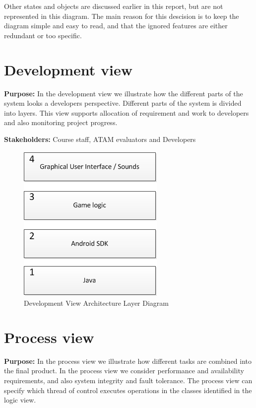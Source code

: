     Other states and objects are discussed earlier in this report, but are not represented in this diagram. The main reason for this descision is to keep the diagram simple and easy to read, and that the ignored features are either redundant or too specific.



    \section{Development view}
    \textbf{Purpose:} In the development view we illustrate how the different parts of the system looks a developers perspective. Different parts of the system is divided into layers. This view supports allocation of requirement
    and work to developers and also monitoring project progress.  
    
    \noindent\textbf{Stakeholders:} Course staff, ATAM evaluators and Developers
    

    \begin{figure}[ht]
        \includegraphics{DevelopmentView.png}
        \caption{Development View Architecture Layer Diagram}
        \label{fig:DevelopmentView}
    \end{figure}
    
    
    
    \section{Process view}
    \noindent\textbf{Purpose:} In the process view we illustrate how different tasks are combined into the final product. In the process view we consider performance and availability requirements, and also system integrity and fault tolerance.
    The process view can specify which thread of control executes operations in the classes identified in the logic view. 

